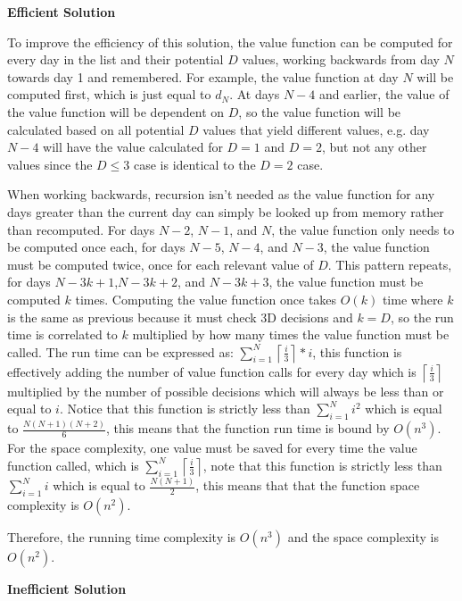 \textbf{Efficient Solution}

To improve the efficiency of this solution, the value function can be computed for every day in the list and their potential $D$ values, working backwards from day $N$ towards day 1 and remembered. For example, the value function at day $N$ will be computed first, which is just equal to $d_N$. At days $N-4$ and earlier, the value of the value function will be dependent on $D$, so the value function will be calculated based on all potential $D$ values that yield different values, e.g. day $N-4$ will have the value calculated for $D=1$ and $D=2$, but not any other values since the $D \leq 3$ case is identical to the $D=2$ case.

When working backwards, recursion isn't needed as the value function for any days greater than the current day can simply be looked up from memory rather than recomputed. For days $N-2$, $N-1$, and $N$, the value function only needs to be computed once each, for days $N-5$, $N-4$, and $N-3$, the value function must be computed twice, once for each relevant value of $D$. This pattern repeats, for days $N-3k+1$,$ N-3k+2$, and $N-3k+3$, the value function must be computed $k$ times. Computing the value function once takes $O(k)$ time where $k$ is the same as previous because it must check 3D decisions and $k=D$, so the run time is correlated to $k$ multiplied by how many times the value function must be called. The run time can be expressed as: $\sum_{i=1}^{N}{\left\lceil\frac{i}{3}\right\rceil\ast i}$, this function is effectively adding the number of value function calls for every day which is $\left\lceil\frac{i}{3}\right\rceil$ multiplied by the number of possible decisions which will always be less than or equal to $i$. Notice that this function is strictly less than $\sum_{i=1}^{N}i^2$ which is equal to $\frac{N(N+1)(N+2)}{6}$, this means that the function run time is bound by $O(n^3)$. For the space complexity, one value must be saved for every time the value function called, which is $\sum_{i=1}^{N}\left\lceil\frac{i}{3}\right\rceil$, note that this function is strictly less than $\sum_{i=1}^{N}i$ which is equal to $\frac{N(N+1)}{2}$, this means that that the function space complexity is $O(n^2)$.

Therefore, the running time complexity is $O(n^3)$ and the space complexity is $O(n^2)$.

\textbf{Inefficient Solution}


